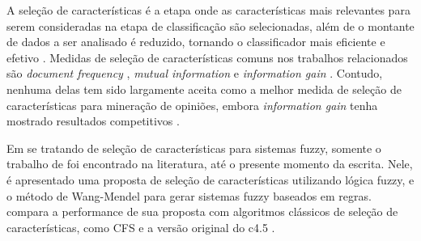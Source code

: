 \documentclass[template.tex]{subfiles}
\begin{document}

A seleção de características é a etapa onde as características mais relevantes para serem consideradas na etapa de classificação são selecionadas, além de o montante de dados a ser analisado é reduzido, tornando o classificador mais eficiente e efetivo \cite{moraes2012document}. Medidas de seleção de características comuns nos trabalhos relacionados são \textit{document frequency} \cite{pang2002thumbs}, \textit{mutual information} \cite{turney2002thumbs} e \textit{information gain} \cite{wiebe2006word}. 
 Contudo, nenhuma delas tem sido largamente aceita como a melhor medida de seleção de características para mineração de opiniões, embora \textit{information gain} tenha mostrado resultados competitivos \cite{moraes2012document}.


Em se tratando de seleção de características para sistemas fuzzy, somente o trabalho de  foi encontrado na literatura, até o presente momento da escrita. Nele, é apresentado uma proposta de seleção de características utilizando lógica fuzzy,  e o método de Wang-Mendel \cite{wang1992generating} para gerar sistemas fuzzy baseados em regras.  compara a performance de sua proposta com algoritmos clássicos de seleção de características, como CFS \cite{hall1999correlation} e a versão original do c4.5 \cite{salzberg1994c4}. 
\end{document}
